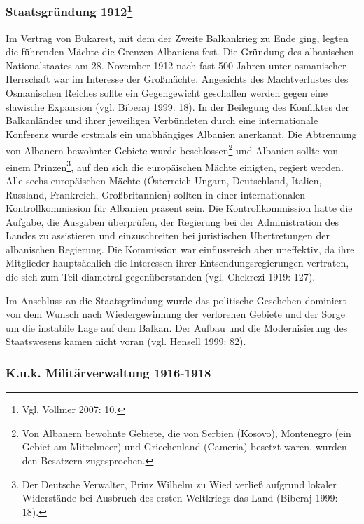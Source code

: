 \subsubsection[Staatsgründung 1912 ]{Staatsgründung 1912\footnote{Vgl. Vollmer 2007: 10.}}

Im Vertrag von Bukarest, mit dem der Zweite Balkankrieg zu Ende ging, legten die führenden Mächte die Grenzen Albaniens fest. Die Gründung des albanischen Nationalstaates am 28. November 1912 nach fast 500 Jahren unter osmanischer Herrschaft war im Interesse der Großmächte. Angesichts des Machtverlustes des Osmanischen Reiches sollte ein Gegengewicht geschaffen werden gegen eine slawische Expansion (vgl. Biberaj 1999: 18). In der Beilegung des Konfliktes der Balkanländer und ihrer jeweiligen Verbündeten durch eine internationale Konferenz wurde erstmals ein unabhängiges Albanien anerkannt. Die Abtrennung von Albanern bewohnter Gebiete wurde beschlossen\footnote{Von Albanern bewohnte Gebiete, die von Serbien (Kosovo), Montenegro (ein Gebiet am Mittelmeer) und Griechenland (Cameria) besetzt waren, wurden den Besatzern zugesprochen. } und Albanien sollte von einem Prinzen\footnote{Der Deutsche Verwalter, Prinz Wilhelm zu Wied verließ aufgrund lokaler Widerstände bei Ausbruch des ersten Weltkriegs das Land (Biberaj 1999: 18). }, auf den sich die europäischen Mächte einigten, regiert werden. Alle sechs europäischen Mächte (Österreich-Ungarn, Deutschland, Italien, Russland, Frankreich, Großbritannien) sollten in einer internationalen Kontrollkommission für Albanien präsent sein. Die Kontrollkommission hatte die Aufgabe, die Ausgaben überprüfen, der Regierung bei der Administration des Landes zu assistieren und einzuschreiten bei juristischen Übertretungen der albanischen Regierung. Die Kommission war einflussreich aber uneffektiv, da ihre Mitglieder hauptsächlich die Interessen ihrer Entsendungsregierungen vertraten, die sich zum Teil diametral gegenüberstanden (vgl. Chekrezi 1919: 127).\par
Im Anschluss an die Staatsgründung wurde das politische Geschehen dominiert von dem Wunsch nach Wiedergewinnung der verlorenen Gebiete und der Sorge um die instabile Lage auf dem Balkan. Der Aufbau und die Modernisierung des Staatswesens kamen nicht voran (vgl. Hensell 1999: 82).
\subsubsection{K.u.k. Militärverwaltung 1916-1918}

